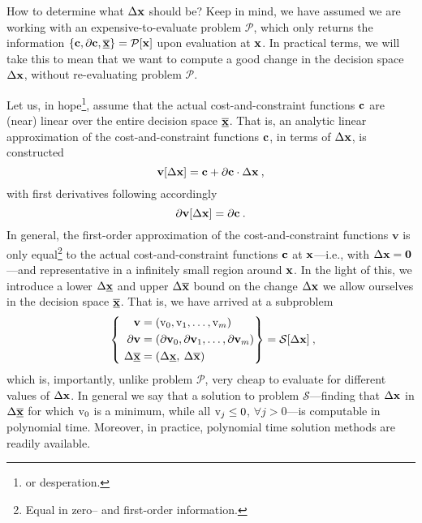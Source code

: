 \documentclass[11pt]{article}
\begin{document}
How to determine what $\Delta \mathbf{x}$ should be? Keep in mind, we have assumed we are working with an expensive-to-evaluate problem $\mathcal{P}$, which only returns the information $\left\{\mathbf{c}, \partial \mathbf{c}, \underline{\overline{\mathbf{x}}}\right\}=\mathcal{P}[\mathbf{x}]$ upon evaluation at $\mathbf{x}$. In practical terms, we will take this to mean that we want to compute a good change in the decision space $\Delta \mathbf{x}$, without re-evaluating problem $\mathcal{P}$.

Let us, in hope\footnote{or desperation.}, assume that the actual cost-and-constraint functions $\mathbf{c}$ are (near) linear over the entire decision space $\underline{\overline{\mathbf{x}}}$. That is, an analytic linear approximation of the cost-and-constraint functions $\mathbf{c}$, in terms of $\Delta \mathbf{x}$, is constructed
\begin{equation}
\textbf{v}[\Delta \mathbf{x}] = \mathbf{c} + \partial \mathbf{c} \cdot  \Delta \mathbf{x}   \:,
\end{equation}
with first derivatives following accordingly
\begin{equation}
\partial \textbf{v}[\Delta \mathbf{x}] = \partial \mathbf{c} \:.
\end{equation}
In general, the first-order approximation of the cost-and-constraint functions $\textbf{v}$ is only equal\footnote{Equal in zero-- and first-order information.} to the actual cost-and-constraint functions $\mathbf{c}$ at $\mathbf{x}$---i.e., with $\Delta \mathbf{x}=\textbf{0}$---and representative in a infinitely small region around $\mathbf{x}$. In the light of this, we introduce a lower $\Delta \underline{\mathbf{x}}$ and upper $\Delta \overline{\mathbf{x}}$ bound on the change $\Delta \mathbf{x}$ we allow ourselves in the decision space $\underline{\overline{\mathbf{x}}}$.
That is, we have arrived at a subproblem 
\begin{align}
\label{d:eqn:p}
 ~\left\{ ~
\begin{aligned}
\mathbf{v} &= (\textrm{v}_0, \textrm{v}_1, \ldots, \textrm{v}_m ) \\
\mathbf{\partial v} & = (\mathbf{\partial v}_0 , \mathbf{\partial v}_1 , \ldots,\mathbf{\partial v}_m  ) \\
\Delta \underline{\overline{\mathbf{x}}} & = ( \Delta \underline{\mathbf{x}} , \: \Delta \overline{\mathbf{x}} ) \:
\end{aligned}\right\} =
\mathcal{S} [\Delta \mathbf{x}] \: ,
\end{align}
which is, importantly, unlike problem $\mathcal{P}$, very cheap to evaluate for different values of $\Delta \mathbf{x}$. In general we say that a solution to problem $\mathcal{S}$---finding that $\Delta \mathbf{x}$ in $\Delta \overline{\underline{\mathbf{x}}}$ for which $\textrm{v}_0$ is a minimum, while all $\textrm{v}_j \leq 0$, $\forall j > 0$---is computable in polynomial time. Moreover, in practice, polynomial time solution methods are readily available.
\end{document}
